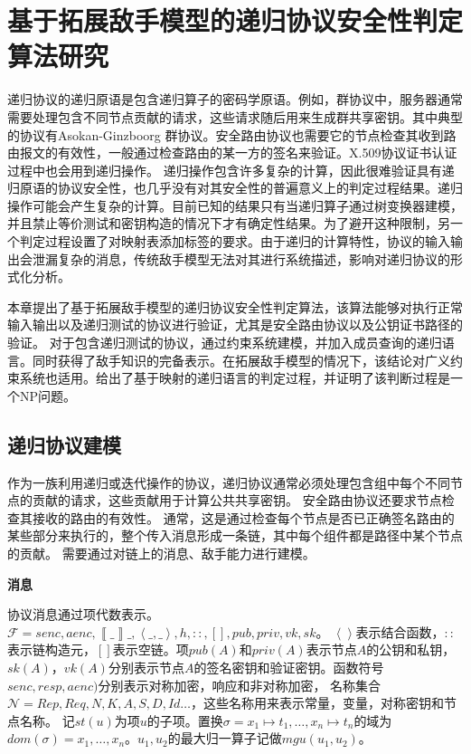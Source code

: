 \chapter{基于拓展敌手模型的递归协议安全性判定算法研究}
递归协议的递归原语是包含递归算子的密码学原语。例如，群协议中，服务器通常需要处理包含不同节点贡献的请求，这些请求随后用来生成群共享密钥。其中典型的协议有Asokan-Ginzboorg 群协议\cite{asokan2000key}。安全路由协议也需要它的节点检查其收到路由报文的有效性，一般通过检查路由的某一方的签名来验证。X.509协议证书认证过程中也会用到递归操作。
递归操作包含许多复杂的计算，因此很难验证具有递归原语的协议安全性，也几乎没有对其安全性的普遍意义上的判定过程结果。递归操作可能会产生复杂的计算。目前已知的结果只有当递归算子通过树变换器建模，并且禁止等价测试和密钥构造的情况下才有确定性结果。为了避开这种限制，另一个判定过程设置了对映射表添加标签的要求。由于递归的计算特性，协议的输入输出会泄漏复杂的消息，传统敌手模型无法对其进行系统描述，影响对递归协议的形式化分析。


本章提出了基于拓展敌手模型的递归协议安全性判定算法，该算法能够对执行正常输入输出以及递归测试的协议进行验证，尤其是安全路由协议以及公钥证书路径的验证。
对于包含递归测试的协议，通过约束系统建模，并加入成员查询的递归语言。同时获得了敌手知识的完备表示。在拓展敌手模型的情况下，该结论对广义约束系统也适用。给出了基于映射的递归语言的判定过程，并证明了该判断过程是一个NP问题。



\section{递归协议建模}
作为一族利用递归或迭代操作的协议，递归协议通常必须处理包含组中每个不同节点的贡献的请求，这些贡献用于计算公共共享密钥。 安全路由协议还要求节点\cite{buttyán2004towards}\cite{feng2009uc}检查其接收的路由的有效性。 通常，这是通过检查每个节点是否已正确签名路由的某些部分来执行的，整个传入消息形成一条链，其中每个组件都是路径中某个节点的贡献。 需要通过对链上的消息、敌手能力进行建模。



\textbf{消息}

协议消息通过项代数表示。
$\mathcal{F}={senc,aenc,\left\llbracket \_\right\rrbracket \_,\left\langle \_,\_\right\rangle ,h,::,[],pub,priv,vk,sk}$。
$\left\langle \right\rangle $表示结合函数，$::$表示链构造元，$[]$表示空链。项$pub(A)$和$priv(A)$表示节点$A$的公钥和私钥，$sk(A)，vk(A)$分别表示节点$A$的签名密钥和验证密钥。函数符号$senc,resp,aenc)$分别表示对称加密，响应和非对称加密，
名称集合$\mathcal{N}={Rep,Req,N,K,A,S,D,Id\ldots}$，这些名称用来表示常量，变量，对称密钥和节点名称。
记$st(u)$为项$u$的子项。置换$\sigma={x_1 \mapsto t_1,\ldots, x_n\mapsto t_n}$的域为$dom(\sigma)={x_1,\ldots,x_n}$。$u_1,u_2$的最大归一算子记做$mgu(u_1,u_2)$。

